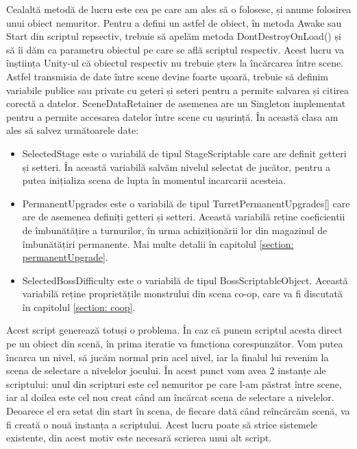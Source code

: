 \documentclass[12pt, a4paper]{article}
\begin{document}
	Cealaltă metodă de lucru este cea pe care am ales să o folosesc, și anume folosirea unui obiect nemuritor. Pentru a defini un astfel de obiect, în metoda Awake sau Start din scriptul repsectiv, trebuie să apelăm metoda DontDestroyOnLoad() și să îi dăm ca parametru obiectul pe care se află scriptul respectiv. Acest lucru va înștiința Unity-ul că obiectul respectiv nu trebuie șters la încărcarea între scene. Astfel transmisia de date între scene devine foarte ușoară, trebuie să definim variabile publice sau private cu geteri și seteri pentru a permite salvarea și citirea corectă a datelor. SceneDataRetainer de asemenea are un Singleton implementat pentru a permite accesarea datelor între scene cu ușurință. În această clasa am ales să salvez următoarele date:
	
	\begin{itemize}
		\item SelectedStage este o variabilă de tipul StageScriptable care are definit getteri și setteri. În această variabilă salvăm nivelul selectat de jucător, pentru a putea inițializa scena de lupta în momentul incarcarii acesteia.
		\item PermanentUpgrades este o variabilă de tipul TurretPermanentUpgrades[] care are de asemenea definiți getteri și setteri. Această variabilă reține coeficientii de îmbunătățire a turnurilor, în urma achiziționării lor din magazinul de îmbunătățiri permanente. Mai multe detalii în capitolul \ref{section: permanentUpgrade}.
		\item SelectedBossDifficulty este o variabilă de tipul BossScriptableObject. Această variabilă reține proprietățile monstrului din scena co-op, care va fi discutată în capitolul \ref{section: coop}.
	\end{itemize}
	
	Acest script generează totuși o problema. În caz că punem scriptul acesta direct pe un obiect din scenă, în prima iteratie va funcționa corespunzător. Vom putea încarca un nivel, să jucăm normal prin acel nivel, iar la finalul lui revenim la scena de selectare a nivelelor jocului. În acest punct vom avea 2 instanțe ale scriptului: unul din scripturi este cel nemuritor pe care l-am păstrat între scene, iar al doilea este cel nou creat când am încărcat scena de selectare a nivelelor. Deoarece el era setat din start în scena, de fiecare dată când reîncărcăm scenă, va fi creată o nouă instanța a scriptului. Acest lucru poate să strice sistemele existente, din acest motiv este necesară scrierea unui alt script.
	\newline
	
\end{document}
